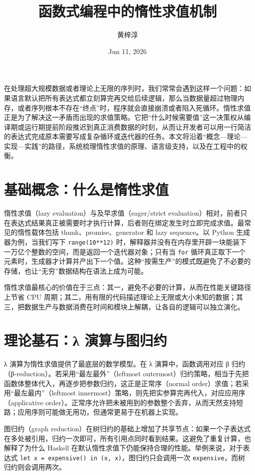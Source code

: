 \title{函数式编程中的惰性求值机制}
\author{黄梓淳}
\date{Jun 11, 2026}
\maketitle
在处理超大规模数据或者理论上无限的序列时，我们常常会遇到这样一个问题：如果语言默认把所有表达式都立刻算完再交给后续逻辑，那么当数据量超过物理内存，或者序列根本不存在“终点”时，程序就会直接崩溃或者陷入死循环。惰性求值正是为了解决这一矛盾而出现的求值策略。它把“什么时候需要值”这一决策权从编译期或运行期提前阶段推迟到真正消费数据的时刻，从而让开发者可以用一行简洁的表达式完成原本需要写成复杂循环或迭代器的任务。本文将沿着“概念—理论—实现—实践”的路径，系统梳理惰性求值的原理、语言级支持，以及在工程中的权衡。\par
\chapter{基础概念：什么是惰性求值}
惰性求值（lazy evaluation）与及早求值（eager/strict evaluation）相对，前者只在表达式结果真正被需要时才执行计算，后者则在绑定发生时立即完成求值。最常见的惰性载体包括 thunk、promise、generator 和 lazy sequence。以 Python 生成器为例，当我们写下 \texttt{range(10**12)} 时，解释器并没有在内存里开辟一块能装下一万亿个整数的空间，而是返回一个迭代器对象；只有当 \texttt{for} 循环真正取下一个元素时，生成器才计算并产出下一个值。这种“按需生产”的模式既避免了不必要的存储，也让“无穷”数据结构在语法上成为可能。\par
惰性求值最核心的价值在于三点：其一，避免不必要的计算，从而在性能关键路径上节省 CPU 周期；其二，用有限的代码描述理论上无限或大小未知的数据；其三，把数据生产与数据消费在时间和模块上解耦，让各自的逻辑可以独立演化。\par
\chapter{理论基石：λ 演算与图归约}
λ 演算为惰性求值提供了最底层的数学模型。在 λ 演算中，函数调用对应 β 归约（β-reduction）。若采用“最左最外”（leftmost outermost）归约策略，相当于先把函数体整体代入，再逐步把参数归约，这正是正常序（normal order）求值；若采用“最左最内”（leftmost innermost）策略，则先把实参算完再代入，对应应用序（applicative order）。正常序允许把未被用到的参数整个丢弃，从而天然支持短路；应用序则可能做无用功，但通常更易于在机器上实现。\par
图归约（graph reduction）在树归约的基础上增加了共享节点：如果一个子表达式在多处被引用，归约一次即可，所有引用点同时看到结果。这避免了重复计算，也解释了为什么 Haskell 在默认惰性求值下仍能保持合理的性能。举例来说，对于表达式 \texttt{let x = expensive() in (x, x)}，图归约只会调用一次 \texttt{expensive}，而树归约则会调用两次。\par
